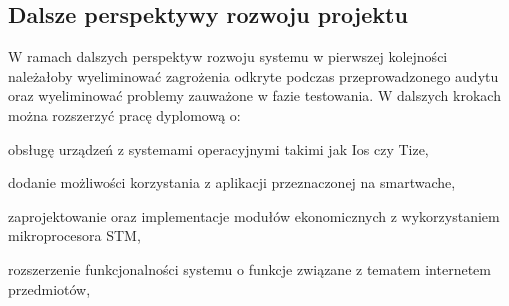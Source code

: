 	\subsection{Dalsze perspektywy rozwoju projektu}
	W ramach dalszych perspektyw rozwoju systemu \NazwaSys w pierwszej kolejności należałoby wyeliminować zagrożenia odkryte podczas przeprowadzonego audytu oraz  wyeliminować problemy zauważone w fazie testowania. 
	W dalszych krokach można rozszerzyć pracę dyplomową o:
	\begin{itemize*}
	\item  obsługę urządzeń z systemami operacyjnymi takimi jak Ios czy Tize,
	\item dodanie możliwości korzystania z aplikacji przeznaczonej na smartwache, 
	\item zaprojektowanie oraz implementacje modułów ekonomicznych z wykorzystaniem mikroprocesora STM,
	\item rozszerzenie funkcjonalności systemu o funkcje związane z tematem internetem przedmiotów,
	 
	\end{itemize*}
	
 
	 